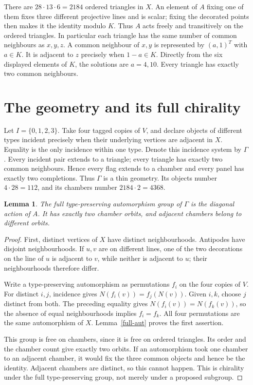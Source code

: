 \documentclass[11pt,a4paper]{article}
\newtheorem{lemma}[theorem]{Lemma}
\begin{document}
There are $28\cdot13\cdot6=2184$ ordered triangles in $X$.
An element of $A$ fixing one of them fixes three different
projective lines and is scalar; fixing the decorated points then
makes it the identity modulo $K$. Thus $A$ acts freely and
transitively on the ordered triangles. In particular each triangle
has the same number of common neighbours as $x,y,z$.
A common neighbour of $x,y$ is represented by $(a,1)^T$ with
$a\in K$. It is adjacent to $z$ precisely when $1-a\in K$.
Directly from the six displayed elements of $K$, the solutions
are $a=4,10$. Every triangle has exactly two common neighbours.

\section{The geometry and its full chirality}
Let $I=\{0,1,2,3\}$. Take four tagged copies of $V$, and declare
objects of different types incident precisely when their underlying
vertices are adjacent in $X$. Equality is the only incidence within
one type. Denote this incidence system by $\Gamma$.
Every incident pair extends to a triangle; every triangle has exactly
two common neighbours. Hence every flag extends to a chamber and
every panel has exactly two completions. Thus $\Gamma$ is a thin
geometry. Its objects number $4\cdot28=112$, and its chambers
number $2184\cdot2=4368$.

\begin{lemma}\label{geometry-aut}
The full type-preserving automorphism group of $\Gamma$ is the
diagonal action of $A$. It has exactly two chamber orbits, and
adjacent chambers belong to different orbits.
\end{lemma}
\begin{proof}
First, distinct vertices of $X$ have distinct neighbourhoods.
Antipodes have disjoint neighbourhoods. If $u,v$ are on different
lines, one of the two decorations on the line of $u$ is adjacent
to $v$, while neither is adjacent to $u$; their neighbourhoods
therefore differ.

Write a type-preserving automorphism as permutations $f_i$ on the
four copies of $V$. For distinct $i,j$, incidence gives
$N(f_i(v))=f_j(N(v))$. Given $i,k$, choose $j$ distinct from both.
The preceding equality gives $N(f_i(v))=N(f_k(v))$, so the absence
of equal neighbourhoods implies $f_i=f_k$. All four permutations
are the same automorphism of $X$. Lemma~\ref{full-aut} proves the
first assertion.

This group is free on chambers, since it is free on ordered
triangles. Its order and the chamber count give exactly two
orbits. If an automorphism took one chamber to an adjacent
chamber, it would fix the three common objects and hence be
the identity. Adjacent chambers are distinct, so this cannot
happen. This is chirality under the full type-preserving group,
not merely under a proposed subgroup.
\end{proof}
\end{document}
